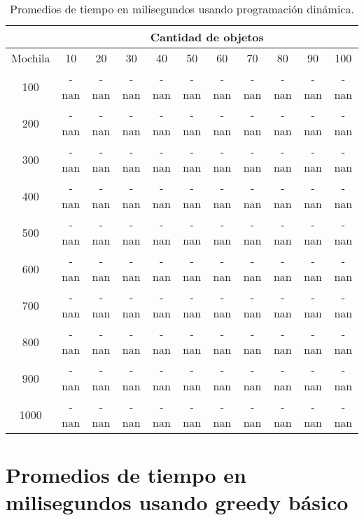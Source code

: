 \documentclass[a4paper]{article}
\begin{document}
\begin{table}[H]
\centering
\relax
\resizebox{\textwidth}{!} {%
\begin{tabular}{|c|c|c|c|c|c|c|c|c|c|c|}
\cline{2-11}
 \multicolumn{1}{c}{} & \multicolumn{10}{|c|}{\textbf{Cantidad de objetos}} \\
\hline
Mochila & 10 & 20 & 30 & 40 & 50 & 60 & 70 & 80 & 90 & 100 \\
\hline
\hline
100 & -nan & -nan & -nan & -nan & -nan & -nan & -nan & -nan & -nan & -nan \\
\hline
\hline
200 & -nan & -nan & -nan & -nan & -nan & -nan & -nan & -nan & -nan & -nan \\
\hline
\hline
300 & -nan & -nan & -nan & -nan & -nan & -nan & -nan & -nan & -nan & -nan \\
\hline
\hline
400 & -nan & -nan & -nan & -nan & -nan & -nan & -nan & -nan & -nan & -nan \\
\hline
\hline
500 & -nan & -nan & -nan & -nan & -nan & -nan & -nan & -nan & -nan & -nan \\
\hline
\hline
600 & -nan & -nan & -nan & -nan & -nan & -nan & -nan & -nan & -nan & -nan \\
\hline
\hline
700 & -nan & -nan & -nan & -nan & -nan & -nan & -nan & -nan & -nan & -nan \\
\hline
\hline
800 & -nan & -nan & -nan & -nan & -nan & -nan & -nan & -nan & -nan & -nan \\
\hline
\hline
900 & -nan & -nan & -nan & -nan & -nan & -nan & -nan & -nan & -nan & -nan \\
\hline
\hline
1000 & -nan & -nan & -nan & -nan & -nan & -nan & -nan & -nan & -nan & -nan \\
\hline
\end{tabular}%
}
\caption{Promedios de tiempo en milisegundos usando programación dinámica.}
\end{table}
\section{Promedios de tiempo en milisegundos usando greedy básico}
\end{document}
